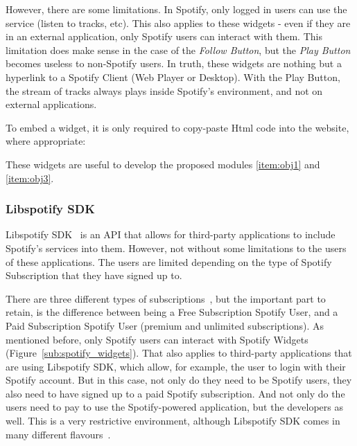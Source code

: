         However, there are some limitations.
        In Spotify, only logged in users can use the service (listen to tracks, etc).
        This also applies to these widgets - even if they are in an external application, only Spotify users can interact with them.
        This limitation does make sense in the case of the \emph{Follow Button}, but the \emph{Play Button} becomes useless to non-Spotify users.
        In truth, these widgets are nothing but a hyperlink to a Spotify Client (Web Player or Desktop).
        With the Play Button, the stream of tracks always plays inside Spotify's environment, and not on external applications.

        To embed a widget, it is only required to copy-paste Html code into the website, where appropriate:

        

        These widgets are useful to develop the proposed modules \ref{item:obj1} and \ref{item:obj3}.


      \subsubsection{Libspotify SDK} %
      \label{sub:libspotify_sdk}

        Libspotify SDK~\cite{libspotifysdk} is an API that allows for third-party applications to include Spotify's services into them.
        However, not without some limitations to the users of these applications.
        The users are limited depending on the type of Spotify Subscription that they have signed up to.

        There are three different types of subscriptions~\cite{spsubscription}, but the important part to retain, is the difference between being a Free Subscription Spotify User, and a Paid Subscription Spotify User (premium and unlimited subscriptions).
        As mentioned before, only Spotify users can interact with Spotify Widgets (Figure~\ref{sub:spotify_widgets}).
        That also applies to third-party applications that are using Libspotify SDK, which allow, for example, the user to login with their Spotify account.
        But in this case, not only do they need to be Spotify users, they also need to have signed up to a paid Spotify subscription.
        And not only do the users need to pay to use the Spotify-powered application, but the developers as well.
        This is a very restrictive environment, although Libspotify SDK comes in many different flavours~\cite{libspotifysdkdown}.

